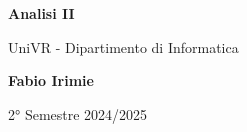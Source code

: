 \begin{titlepage}
	\begin{center}
		\vspace*{1cm}

		\Huge
		\textbf{Analisi II}

		\vspace{0.5cm}
		\LARGE
		UniVR - Dipartimento di Informatica

		\vspace{1.5cm}

		\textbf{Fabio Irimie}

		\vfill


		\vspace{0.8cm}


		2° Semestre 2024/2025

	\end{center}
\end{titlepage}
